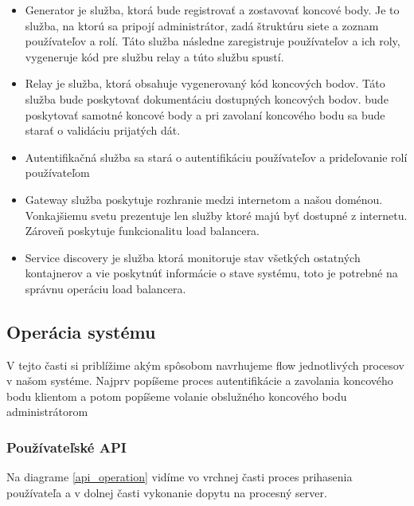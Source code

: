 \begin{itemize}
\item Generator je služba, ktorá bude registrovať a zostavovať koncové body. Je to služba, na ktorú sa pripojí administrátor, zadá štruktúru siete a zoznam používateľov a rolí. Táto služba následne zaregistruje používateľov a ich roly, vygeneruje kód pre službu relay a túto službu spustí.
\item Relay je služba, ktorá obsahuje vygenerovaný kód koncových bodov. Táto služba bude poskytovať dokumentáciu dostupných koncových bodov. bude poskytovať samotné koncové body a pri zavolaní koncového bodu sa bude starať o validáciu prijatých dát.
\item Autentifikačná služba sa stará o autentifikáciu používateľov a prideľovanie rolí používateľom
\item Gateway služba poskytuje rozhranie medzi internetom a našou doménou. Vonkajšiemu svetu prezentuje len služby ktoré majú byť dostupné z internetu. Zároveň poskytuje funkcionalitu load balancera.
\item Service discovery je služba ktorá monitoruje stav všetkých ostatných kontajnerov a vie poskytnúť informácie o stave systému, toto je potrebné na správnu operáciu load balancera.
\end{itemize}


\subsection{Operácia systému}
V tejto časti si priblížime akým spôsobom navrhujeme flow jednotlivých procesov v našom systéme. Najprv popíšeme proces autentifikácie a zavolania koncového bodu klientom a potom popíšeme volanie obslužného koncového bodu administrátorom
\subsubsection{Používateľské API}
Na diagrame \ref{api_operation} vidíme vo vrchnej časti proces prihasenia používateľa a v dolnej časti vykonanie dopytu na procesný server.


